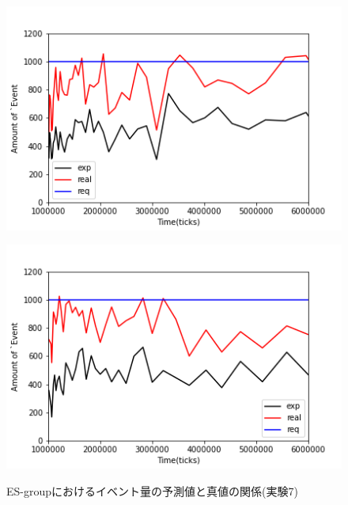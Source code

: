 \documentclass[12pt,a4j,twoside]{jarticle}
\begin{document}
  \begin{figure}
    \begin{minipage}{0.48\hsize}
      \centering
      \includegraphics[width=0.99\hsize]{figures/ExpReal_Office_ESgroup_0.png}
      \label{subfig:expReal_Office_ES_0}
    \end{minipage}
    \hfill
    \begin{minipage}{0.48\hsize}
      \centering
      \includegraphics[width=0.99\hsize]{figures/ExpReal_Office_ESgroup_7.png}
      \label{subfig:expReal_Office_ES_7}
    \end{minipage}
    \caption{ES-groupにおけるイベント量の予測値と真値の関係(実験7)}
    \label{fig:expReal_Office_ES}
  \end{figure}
\end{document}

